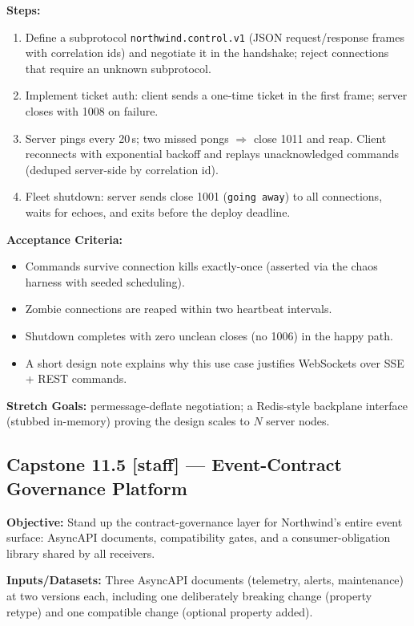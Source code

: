 \textbf{Steps:}
\begin{enumerate}
  \item Define a subprotocol \texttt{northwind.control.v1} (JSON
        request/response frames with correlation ids) and negotiate it in
        the handshake; reject connections that require an unknown
        subprotocol.
  \item Implement ticket auth: client sends a one-time ticket in the first
        frame; server closes with 1008 on failure.
  \item Server pings every 20\,s; two missed pongs $\Rightarrow$ close 1011
        and reap. Client reconnects with exponential backoff and replays
        unacknowledged commands (deduped server-side by correlation id).
  \item Fleet shutdown: server sends close 1001 (\texttt{going away}) to all
        connections, waits for echoes, and exits before the deploy deadline.
\end{enumerate}

\textbf{Acceptance Criteria:}
\begin{itemize}[label=$\square$]
  \item Commands survive connection kills exactly-once (asserted via the
        chaos harness with seeded scheduling).
  \item Zombie connections are reaped within two heartbeat intervals.
  \item Shutdown completes with zero unclean closes (no 1006) in the happy
        path.
  \item A short design note explains why this use case justifies WebSockets
        over SSE + REST commands.
\end{itemize}

\textbf{Stretch Goals:} permessage-deflate negotiation; a Redis-style
backplane interface (stubbed in-memory) proving the design scales to $N$
server nodes.

\subsection{Capstone 11.5 [staff] --- Event-Contract Governance Platform}

\textbf{Objective:} Stand up the contract-governance layer for Northwind's
entire event surface: AsyncAPI documents, compatibility gates, and a
consumer-obligation library shared by all receivers.

\textbf{Inputs/Datasets:} Three AsyncAPI documents (telemetry, alerts,
maintenance) at two versions each, including one deliberately breaking change
(property retype) and one compatible change (optional property added).


